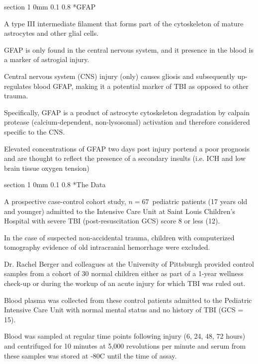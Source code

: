 \documentclass[12pt]{article}
\makeatletter
\newcommand{\9}{\\[9pt]}
\newcommand{\bgm}{\color{MyMath}}
\newcommand{\egm}{\color{white}}
\renewcommand{\section}{\@startsection
	    {section}%
	    {1}%
	    {0mm}%
	    {0.1\baselineskip}%
	    {0.8\baselineskip}%
	    {\newpage \color[cmyk]{0.43,0,0.01,0} \center\LARGE}}%
\makeatother
\begin{document}
\begin{landscape}
\begin{Large}
{\section*{GFAP}
\begin{ohlist}
    \item   A type III intermediate filament that forms part of the cytoskeleton of mature astrocytes and other glial cells. 
    \item   GFAP is only found in the central nervous system, and it presence in the blood is a marker of astrogial injury.  
    \item   Central nervous system (CNS) injury (only) causes gliosis and subsequently up-regulates blood GFAP, making it a
            potential  marker of TBI as opposed to other trauma.
    \item   Specifically, GFAP is a product of astrocyte cytoskeleton degradation by calpain protease (calcium-dependent,
            non-lysosomal) activation and therefore considered specific to the CNS. 
    \item   Elevated concentrations of GFAP two days post injury portend a poor prognosis and are thought to reflect the presence 
            of a secondary insults (i.e. ICH and low brain tissue oxygen tension)
\end{ohlist}

\section*{The Data}
\begin{ohlist}
    \item   A prospective case-control cohort study, \bgm$n=67$\egm\ pediatric patients (17 years old and younger) admitted to 
            the Intensive Care Unit at Saint Louis Children’s Hospital with severe TBI (post-resuscitation GCS) score 8 or less (12). 
    \item   In the case of suspected non-accidental trauma, children with computerized tomography evidence of old intracranial hemorrhage 
            were excluded. 
    \item   Dr. Rachel Berger and colleagues at the University of Pittsburgh provided control samples from a cohort of 30 normal children 
            either as part of a 1-year wellness check-up or during the workup of an acute injury for which TBI was ruled out.
    \item   Blood plasma was collected from these control patients admitted to the Pediatric Intensive Care Unit with normal mental status and 
            no history of TBI (GCS = 15).  
    \item   Blood was sampled at regular time points following injury (6, 24, 48, 72 hours) and centrifuged for 10 minutes at 5,000 
            revolutions per minute and serum from these samples was stored at -80C until the time of assay.  
\end{ohlist}

}
\end{Large}
\end{landscape}
\end{document}
